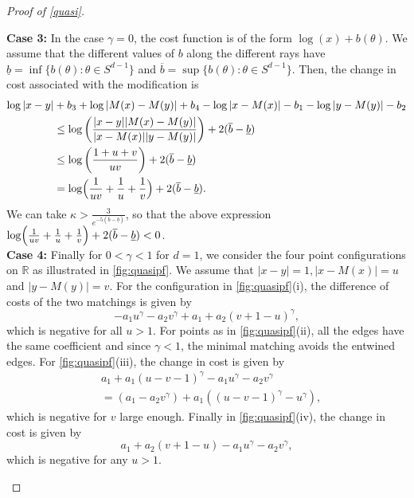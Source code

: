 \documentclass{article}
\newcommand{\R}{\mathbb{R}}
\begin{document}
\begin{proof}[Proof of \cref{quasi}]
\begin{leftbar}
 {\bf Case 3:} In the case $\gamma=0$, the cost function is of the
 form $\log(x)+b(\theta)$. We assume that the different values of $b$
 along the different rays have
 $\underline{b}=\inf\{b(\theta):\theta\in S^{d-1}\}$ and
 $\overline{b}=\sup\{b(\theta):\theta\in S^{d-1}\}$. Then, the change in cost associated
 with the modification is
 \begin{align*}
   \log|x-y|&+b_3+\log|M(x)-M(y)|+b_4-\log|x-M(x)|-b_1-\log|y-M(y)|-b_2
   \\
   & \leq \log\left( \frac{|x-y||M(x)-M(y)|}{|x-M(x)||y-M(y)|} \right)
     + 2(\overline{b}-\underline{b})\\
            & \leq \log\left(\frac{1+u+v}{uv} \right) +
   2(\overline{b}-\underline{b}) \\
   &=\log\Bigl(\frac{1}{uv}+\frac{1}{u}+\frac{1}{v}\Bigr)
   +2(\overline{b}-\underline{b}).
 \end{align*}
 We can take $\kappa>\frac{3}{e^{-5(\overline{b}-\underline{b})}}$, so
 that the above expression $\log\Bigl(\frac{1}{uv}+\frac{1}{u}+\frac{1}{v}\Bigr)
   +2(\overline{b}-\underline{b})<0$.\\
   {\bf Case 4:}
   Finally for $0<\gamma<1$ for $d=1$, we consider the four point
   configurations on $\R$ as illustrated in \cref{fig:quasipf}. We
 assume that $|x-y|=1,|x-M(x)|=u$ and $|y-M(y)|=v$. For the
 configuration in
 \cref{fig:quasipf}(i), the difference of costs of the two matchings
 is given by $$-a_1 u^\gamma-a_2v^\gamma+a_1+a_2(v+1-u)^\gamma,$$ which
 is negative for all $u>1$. For points as in \cref{fig:quasipf}(ii),
 all the edges have the same coefficient and since $\gamma<1$, the
 minimal matching avoids the entwined edges. For
 \cref{fig:quasipf}(iii), the change in cost is given by
 \begin{align}
   \label{eq:temp0}
   &  a_1+a_1(u-v-1)^\gamma - a_1u^\gamma-a_2 v^\gamma\nonumber \\
   &= (a_1-a_2v^\gamma) +a_1((u-v-1)^\gamma-u^\gamma),\nonumber
 \end{align}
which is negative for $v$ large enough.
Finally in \cref{fig:quasipf}(iv), the change in cost is given by $$
a_1+ a_2(v+1-u)-a_1u^\gamma-a_2v^\gamma,$$ which is negative for any
$u>1$.


\end{leftbar}
\end{proof}
\end{document}
